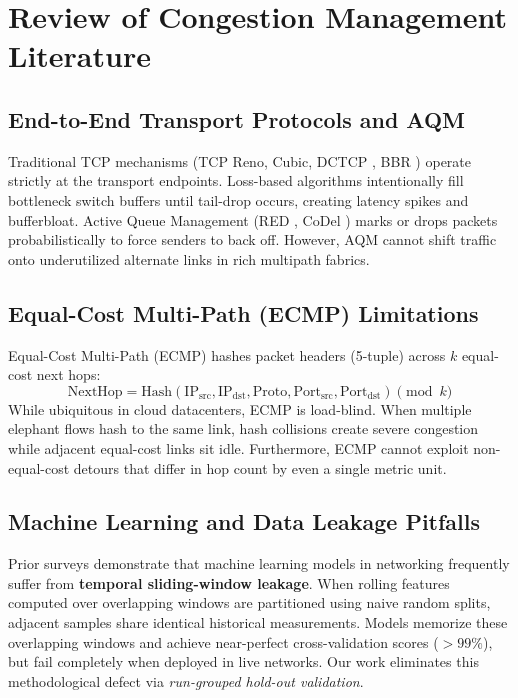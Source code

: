 \section{Review of Congestion Management Literature}

\subsection{End-to-End Transport Protocols and AQM}
Traditional TCP mechanisms (TCP Reno, Cubic, DCTCP \cite{alizadeh2010data}, BBR \cite{cardwell2017bbr}) operate strictly at the transport endpoints. Loss-based algorithms intentionally fill bottleneck switch buffers until tail-drop occurs, creating latency spikes and bufferbloat. Active Queue Management (RED \cite{floyd1993random}, CoDel \cite{nichols2012controlling}) marks or drops packets probabilistically to force senders to back off. However, AQM cannot shift traffic onto underutilized alternate links in rich multipath fabrics.

\subsection{Equal-Cost Multi-Path (ECMP) Limitations}
Equal-Cost Multi-Path (ECMP) \cite{hopps2000analysis} hashes packet headers (5-tuple) across $k$ equal-cost next hops:
\begin{equation}
  \text{NextHop} = \text{Hash}(\text{IP}_{\text{src}}, \text{IP}_{\text{dst}}, \text{Proto}, \text{Port}_{\text{src}}, \text{Port}_{\text{dst}}) \pmod k
\end{equation}
While ubiquitous in cloud datacenters, ECMP is load-blind. When multiple elephant flows hash to the same link, hash collisions create severe congestion while adjacent equal-cost links sit idle. Furthermore, ECMP cannot exploit non-equal-cost detours that differ in hop count by even a single metric unit.

\subsection{Machine Learning and Data Leakage Pitfalls}
Prior surveys \cite{benson2010network, curtis2011mahout} demonstrate that machine learning models in networking frequently suffer from \textbf{temporal sliding-window leakage}. When rolling features computed over overlapping windows are partitioned using naive random splits, adjacent samples share identical historical measurements. Models memorize these overlapping windows and achieve near-perfect cross-validation scores ($>99\%$), but fail completely when deployed in live networks. Our work eliminates this methodological defect via \textit{run-grouped hold-out validation}.

